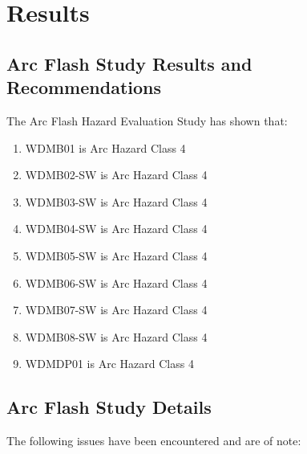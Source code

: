 
\section{Results}
\label{af:results}

\subsection{Arc Flash Study Results and Recommendations}
\label{af:results:afrr}

The Arc Flash Hazard Evaluation Study has shown that:
\begin{enumerate}
\item WDMB01 is Arc Hazard Class 4
\item WDMB02-SW is Arc Hazard Class 4
\item WDMB03-SW is Arc Hazard Class 4
\item WDMB04-SW is Arc Hazard Class 4
\item WDMB05-SW is Arc Hazard Class 4
\item WDMB06-SW is Arc Hazard Class 4
\item WDMB07-SW is Arc Hazard Class 4
\item WDMB08-SW is Arc Hazard Class 4
\item WDMDP01 is Arc Hazard Class 4

\end{enumerate}

\pagebreak

\subsection{Arc Flash Study Details}
\label{af:results:afsd}

The following issues have been encountered and are of note:

